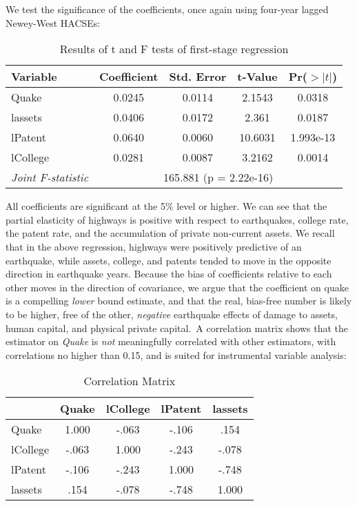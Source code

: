 \documentclass[11pt]{article}
\begin{document}
We test the significance of the coefficients, once again using four-year lagged Newey-West HACSEs:

\begin{table}[H]
\centering
\caption{Results of t and F tests of first-stage regression}
\label{tab:joint_significance}
\begin{tabular}{lcccc}
\toprule
\textbf{Variable} & \textbf{Coefficient} & \textbf{Std. Error} & \textbf{t-Value} & \textbf{Pr($>|t|$)} \\
\midrule
Quake& 0.0245& 0.0114& 2.1543& 0.0318\\
lassets& 0.0406& 0.0172& 2.361& 0.0187\\
lPatent& 0.0640& 0.0060& 10.6031& 1.993e-13\\
 lCollege& 0.0281& 0.0087& 3.2162&0.0014\\
\midrule
\textit{Joint F-statistic} & \multicolumn{4}{c}{165.881 (p = 2.22e-16)} \\
\bottomrule
\end{tabular}
\end{table}

All coefficients are significant at the 5\% level or higher. We can see that the partial elasticity of highways is positive with respect to earthquakes, college rate, the patent rate, and the accumulation of private non-current assets. We recall that in the above regression, highways were positively predictive of an earthquake, while assets, college, and patents tended to move in the opposite direction in earthquake years. Because the bias of coefficients relative to each other moves in the direction of covariance, we argue that the coefficient on quake is a compelling \textit{lower }bound estimate, and that the real, bias-free number is likely to be higher, free of the other, \textit{negative} earthquake effects of damage to assets, human capital, and physical private capital. A correlation matrix shows that the estimator on \textit{Quake }is \textit{not }meaningfully correlated with other estimators, with correlations no higher than 0.15, and is suited for instrumental variable analysis:  

\begin{table}[H]
\centering
\caption{Correlation Matrix}
\label{tab:correlation_matrix}
\begin{tabular}{lcccc}
\toprule
& Quake& lCollege& lPatent& lassets\\
\midrule
Quake& 1.000 & -.063& -.106& .154\\
lCollege& -.063& 1.000 & -.243& -.078\\
lPatent& -.106& -.243& 1.000 & -.748\\
lassets& .154& -.078& -.748& 1.000 \\
\bottomrule
\end{tabular}
\end{table}
\end{document}
